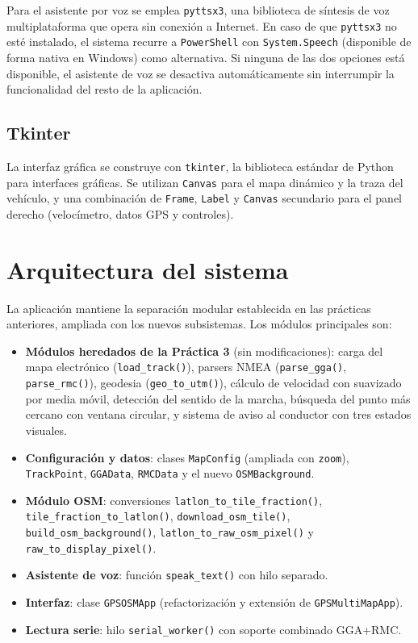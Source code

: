 \documentclass[10pt]{article}
\begin{document}
Para el asistente por voz se emplea \texttt{pyttsx3}, una biblioteca de síntesis de voz multiplataforma que opera sin conexión a Internet. En caso de que \texttt{pyttsx3} no esté instalado, el sistema recurre a \texttt{PowerShell} con \texttt{System.Speech} (disponible de forma nativa en Windows) como alternativa. Si ninguna de las dos opciones está disponible, el asistente de voz se desactiva automáticamente sin interrumpir la funcionalidad del resto de la aplicación.

\subsection{Tkinter}

La interfaz gráfica se construye con \texttt{tkinter}, la biblioteca estándar de Python para interfaces gráficas. Se utilizan \texttt{Canvas} para el mapa dinámico y la traza del vehículo, y una combinación de \texttt{Frame}, \texttt{Label} y \texttt{Canvas} secundario para el panel derecho (velocímetro, datos GPS y controles).

\section{Arquitectura del sistema}

La aplicación mantiene la separación modular establecida en las prácticas anteriores, ampliada con los nuevos subsistemas. Los módulos principales son:

\begin{itemize}[leftmargin=1.2em]
    \item \textbf{Módulos heredados de la Práctica 3} (sin modificaciones): carga del mapa electrónico (\texttt{load\_track()}), parsers NMEA (\texttt{parse\_gga()}, \texttt{parse\_rmc()}), geodesia (\texttt{geo\_to\_utm()}), cálculo de velocidad con suavizado por media móvil, detección del sentido de la marcha, búsqueda del punto más cercano con ventana circular, y sistema de aviso al conductor con tres estados visuales.
    \item \textbf{Configuración y datos}: clases \texttt{MapConfig} (ampliada con \texttt{zoom}), \texttt{TrackPoint}, \texttt{GGAData}, \texttt{RMCData} y el nuevo \texttt{OSMBackground}.
    \item \textbf{Módulo OSM}: conversiones \texttt{latlon\_to\_tile\_fraction()}, \texttt{tile\_fraction\_to\_latlon()}, \texttt{download\_osm\_tile()}, \texttt{build\_osm\_background()}, \texttt{latlon\_to\_raw\_osm\_pixel()} y \texttt{raw\_to\_display\_pixel()}.
    \item \textbf{Asistente de voz}: función \texttt{speak\_text()} con hilo separado.
    \item \textbf{Interfaz}: clase \texttt{GPSOSMApp} (refactorización y extensión de \texttt{GPSMultiMapApp}).
    \item \textbf{Lectura serie}: hilo \texttt{serial\_worker()} con soporte combinado GGA+RMC.
\end{itemize}
\end{document}
